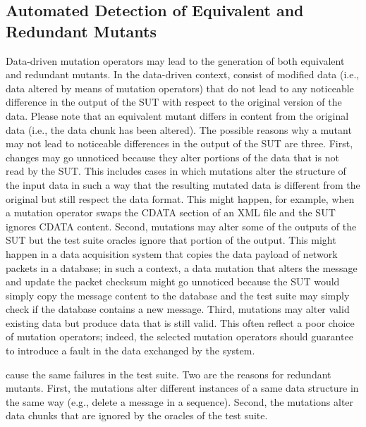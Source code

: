 
\subsection{Automated Detection of Equivalent and Redundant Mutants}
\label{sec:dataequivalent}

Data-driven mutation operators may lead to the generation of both equivalent and redundant mutants.
In the data-driven context,  consist of modified data (i.e., data altered by means of mutation operators) that do not lead to any noticeable difference in the output of the SUT with respect to the original version of the data.
Please note that an equivalent mutant differs in content from the original data (i.e., the data chunk has been altered).
The possible reasons why a mutant may not lead to noticeable differences in the output of the SUT are three. First, changes may go unnoticed because they alter portions of the data that is not read by the SUT. This includes cases in which mutations alter the structure of the input data in such a way that the resulting mutated data is different from the original but still respect the data format. This might happen, for example, when a mutation operator swaps the CDATA section of an XML file and the SUT ignores CDATA content. Second, mutations may alter some of the outputs of the SUT but the test suite oracles ignore that portion of the output. This might happen in a data acquisition system that copies the data payload of network packets in a database; in such a context, a data mutation that alters the message and update the packet checksum might go unnoticed because the SUT would simply copy the message content to the database and the test suite may simply check if the database contains a new message. Third, mutations may alter valid existing data but produce data that is still valid. This often reflect a poor choice of mutation operators; indeed, the selected mutation operators should guarantee to introduce a fault in the data exchanged by the system.




 cause the same failures in the test suite. Two are the reasons for redundant mutants. First, the mutations alter different instances of a same data structure in the same way (e.g., delete a message in a sequence). Second, the mutations alter data chunks that are ignored by the oracles of the test suite.

